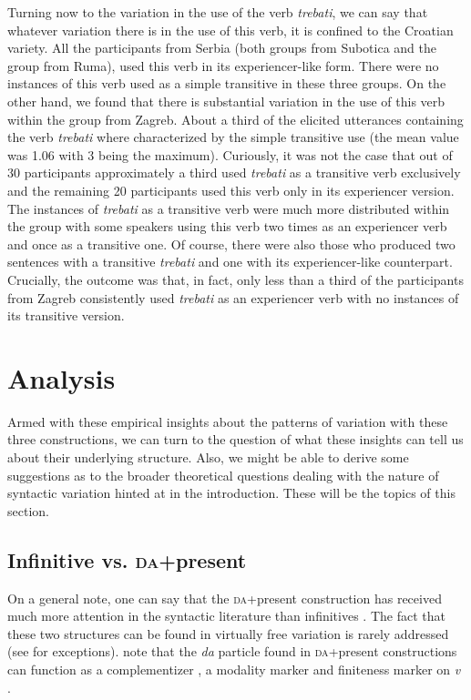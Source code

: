 \documentclass[output=paper,
modfonts,
newtxmath,
hidelinks,
]{langscibook}
\begin{document}
Turning now to the variation in the use of the verb \textit{trebati}, we can say that whatever variation there is in the use of this verb, it is confined to the Croatian variety. All the participants from Serbia (both groups from Subotica and the group from Ruma), used this verb in its experiencer-like form. There were no instances of this verb used as a simple transitive in these three groups. On the other hand, we found that there is substantial variation in the use of this verb within the group from Zagreb. About a third of the elicited utterances containing the verb \textit{trebati} where characterized by the simple transitive use (the mean value was 1.06 with 3 being the maximum). Curiously, it was not the case that out of 30 participants approximately a third used \textit{trebati} as a transitive verb exclusively and the remaining 20 participants used this verb only in its experiencer version. The instances of \textit{trebati} as a transitive verb were much more distributed within the group with some speakers using this verb two times as an experiencer verb and once as a transitive one. Of course, there were also those who produced two sentences with a transitive \textit{trebati} and one with its experiencer-like counterpart. Crucially, the outcome was that, in fact, only less than a third of the participants from Zagreb consistently used \textit{trebati} as an experiencer verb with no instances of its transitive version.

\section{Analysis}\label{s4}

Armed with these empirical insights about the patterns of variation with these three constructions, we can turn to the question of what these insights can tell us about their underlying structure. Also, we might be able to derive some suggestions as to the broader theoretical questions dealing with the nature of syntactic variation hinted at in the introduction. These will be the topics of this section.

\subsection{Infinitive vs. \textsc{da}+present}\label{s4.1}

On a general note, one can say that the \textsc{da}+present construction has received much more attention in the syntactic literature than infinitives \citep{Todorovic2012,Miseska-Tomic2004}. The fact that these two structures can be found in virtually free variation is rarely addressed (see \citealt{Belic2005} for exceptions). \citet{TodorovicWurmbrand2015} note that the \textit{da} particle found in \textsc{da}+present constructions can function as a complementizer , a modality marker  and finiteness marker on \textit{v} .
\end{document}
